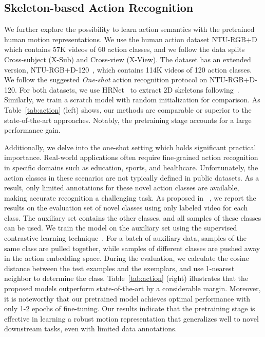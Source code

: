 \subsection{Skeleton-based Action Recognition}
\label{Sec:experiment-action}
We further explore the possibility to learn action semantics with the pretrained human motion representations. We use the human action dataset NTU-RGB+D~\cite{shahroudy2016ntu} which contains 57K videos of 60 action classes, and we follow the data splits Cross-subject (X-Sub) and Cross-view (X-View). The dataset has an extended version, NTU-RGB+D-120~\cite{liu2019ntu}, which contains 114K videos of 120 action classes. We follow the suggested \emph{One-shot} action recognition protocol on NTU-RGB+D-120. For both datasets, we use HRNet~\cite{sun2019deep} to extract 2D skeletons following~\cite{duanrevisiting}. Similarly, we train a scratch model with random initialization for comparison. As Table~\ref{tab:action} (left) shows, our methods are comparable or superior to the state-of-the-art approaches. Notably, the pretraining stage accounts for a large performance gain.


Additionally, we delve into the one-shot setting which holds significant practical importance. Real-world applications often require fine-grained action recognition in specific domains such as education, sports, and healthcare. Unfortunately, the action classes in these scenarios are not typically defined in public datasets. As a result, only limited annotations for these novel action classes are available, making accurate recognition a challenging task. As proposed in ~\cite{liu2019ntu}, we report the results on the evaluation set of  novel classes using only  labeled video for each class. The auxiliary set contains the other  classes, and all samples of these classes can be used. We train the model on the auxiliary set using the supervised contrastive learning technique~\cite{SupContrast}. For a batch of auxiliary data, samples of the same class are pulled together, while samples of different classes are pushed away in the action embedding space. During the evaluation, we calculate the cosine distance between the test examples and the exemplars, and use 1-nearest neighbor to determine the class. Table~\ref{tab:action} (right) illustrates that the proposed models outperform state-of-the-art by a considerable margin. Moreover, it is noteworthy that our pretrained model achieves optimal performance with only 1-2 epochs of fine-tuning. Our results indicate that the pretraining stage is effective in learning a robust motion representation that generalizes well to novel downstream tasks, even with limited data annotations.


















